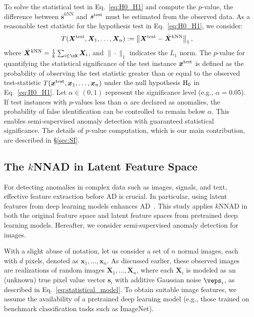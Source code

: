 To solve the statistical test in Eq.~\eqref{eq:H0_H1} and compute the $p$-value, the difference between $\bar{\bm s}^{\text{$k$NN}}$ and $\bm s^{\rm test}$ must be estimated from the observed data.
%
As a reasonable test statistic for the hypothesis test in Eq.~\eqref{eq:H0_H1}, we consider:  
\begin{align}
 \label{eq:test_statistic}
 T(\bm X^{\rm test}, \bm X_1, \ldots, \bm X_n) := \left\| \bm X^{\rm test} - \bar{\bm X}^{\text{$k$NN}} \right\|_1, 
\end{align}
where $\bar{\bm X}^{\text{$k$NN}} = \frac{1}{k} \sum_{i \in \cN} \bm X_i$, and $\| \cdot \|_1$ indicates the $L_1$ norm.
%
The $p$-value for quantifying the statistical significance of the test instance $\bm x^{\rm test}$ is defined as the probability of observing the test statistic greater than or equal to the observed test-statistic $T(\bm x^{\rm test}, \bm x_1, \ldots, \bm x_n)$ under the null hypothesis ${\rm H}_0$ in Eq.~\eqref{eq:H0_H1}.
%
Let $\alpha \in (0, 1)$ represent the significance level (e.g., $\alpha = 0.05$).
%
If test instances with $p$-values less than $\alpha$ are declared as anomalies, the probability of false identification can be controlled to remain below $\alpha$.
%
This enables semi-supervised anomaly detection with guaranteed statistical significance.  
%
The details of $p$-value computation, which is our main contribution, are described in \S\ref{sec:SI}.

\subsection{The $k$NNAD in Latent Feature Space}
%
For detecting anomalies in complex data such as images, signals, and text, effective feature extraction before AD is crucial.
%
In particular, using latent features from deep learning models enhances AD~\cite{li2021cutpaste,chalapathy2019deep,bergman2020deep}.
%
This study applies $k$NNAD in both the original feature space and latent feature spaces from pretrained deep learning models.
%
Hereafter, we consider semi-supervised anomaly detection for images.

With a slight abuse of notation, let us consider a set of $n$ normal images, each with $d$ pixels, denoted as $\bm x_1, \ldots, \bm x_n$.
%
As discussed earlier, these observed images are realizations of random images $\bm X_1, \ldots, \bm X_n$, where each $\bm X_i$ is modeled as an (unknown) true pixel value vector $\bm s_i$ with additive Gaussian noise $\bm \veps_i$, as described in Eq.~\eqref{eq:statistical_model}.  
%
To obtain suitable image features, we assume the availability of a pretrained deep learning model (e.g., those trained on benchmark classification tasks such as ImageNet).  

